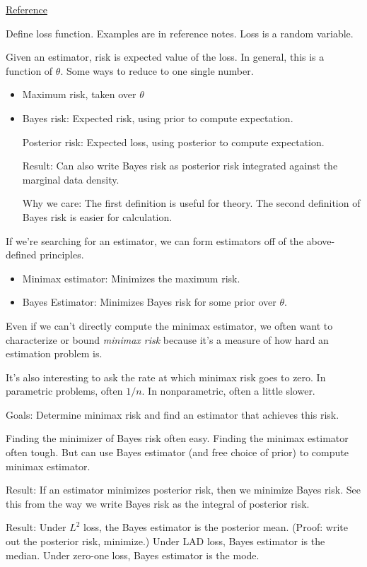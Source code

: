 \documentclass[12pt]{article}
\theoremstyle{plain}
\theoremstyle{definition}
\theoremstyle{remark}
\begin{document}
\href{http://www.stat.cmu.edu/~larry/=stat705/Lecture8.pdf}{Reference}


Define loss function. Examples are in reference notes.
Loss is a random variable.

Given an estimator, risk is expected value of the loss.
In general, this is a function of $\theta$.
Some ways to reduce to one single number.
\begin{itemize}
  \item Maximum risk, taken over $\theta$
  \item Bayes risk:
    Expected risk, using prior to compute expectation.

    Posterior risk:
    Expected loss, using posterior to compute expectation.

    Result:
    Can also write Bayes risk as posterior risk integrated against the
    marginal data density.

    Why we care:
    The first definition is useful for theory.
    The second definition of Bayes risk is easier for calculation.
\end{itemize}
If we're searching for an estimator, we can form estimators off of the
above-defined principles.
\begin{itemize}
  \item Minimax estimator: Minimizes the maximum risk.
  \item Bayes Estimator: Minimizes Bayes risk for some prior over
    $\theta$.
\end{itemize}
Even if we can't directly compute the minimax estimator, we often want
to characterize or bound \emph{minimax risk} because it's a measure of
how hard an estimation problem is.

It's also interesting to ask the rate at which minimax risk goes to
zero.
In parametric problems, often $1/n$. In nonparametric, often a little
slower.

Goals:
Determine minimax risk and find an estimator that achieves this risk.

Finding the minimizer of Bayes risk often easy.
Finding the minimax estimator often tough.
But can use Bayes estimator (and free choice of prior) to compute
minimax estimator.

Result:
If an estimator minimizes posterior risk, then we minimize Bayes risk.
See this from the way we write Bayes risk as the integral of posterior
risk.

Result:
Under $L^2$ loss, the Bayes estimator is the posterior mean.
(Proof: write out the posterior risk, minimize.)
Under LAD loss, Bayes estimator is the median.
Under zero-one loss, Bayes estimator is the mode.
\end{document}

